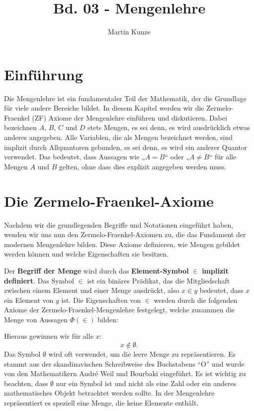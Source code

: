 \documentclass[main.tex]{subfiles}
\title{Bd. 03 - Mengenlehre}
\author{Martin Kunze}
\date{}
\begin{document}
\maketitle
\tableofcontents



\chapter{Einführung}

Die Mengenlehre ist ein fundamentaler Teil der Mathematik, der die Grundlage für viele andere Bereiche bildet. In diesem Kapitel werden wir die Zermelo-Fraenkel (ZF) Axiome der Mengenlehre einführen und diskutieren. Dabei bezeichnen \( A \), \( B \), \( C \) und \( D \) stets Mengen, es sei denn, es wird ausdrücklich etwas anderes angegeben. Alle Variablen, die als Mengen bezeichnet werden, sind implizit durch Allquantoren gebunden, es sei denn, es wird ein anderer Quantor verwendet. Das bedeutet, dass Aussagen wie „\( A = B \)“ oder „\( A \neq B \)“ für alle Mengen \( A \) und \( B \) gelten, ohne dass dies explizit angegeben werden muss.

\chapter{Die Zermelo-Fraenkel-Axiome}
Nachdem wir die grundlegenden Begriffe und Notationen eingeführt haben, wenden wir uns nun den Zermelo-Fraenkel-Axiomen zu, die das Fundament der modernen Mengenlehre bilden. Diese Axiome definieren, wie Mengen gebildet werden können und welche Eigenschaften sie besitzen.
\begin{definition}
Der \textbf{Begriff der Menge} wird durch das \textbf{Element-Symbol} \(\in\) \textbf{implizit definiert}. 
Das Symbol \(\in\) ist ein binäres Prädikat, das die Mitgliedschaft zwischen einem Element und einer Menge 
ausdrückt, also \(x \in y\) bedeutet, dass \(x\) ein Element von \(y\) ist. Die Eigenschaften von \(\in\) 
werden durch die folgenden Axiome der Zermelo-Fraenkel-Mengenlehre festgelegt, welche zusammen die Menge von 
Aussagen \(\Phi(\in)\) bilden:
\end{definition}



\begin{remark}
    Hieraus gewinnen wir für alle \(x\):
    \[
    x \not\in \emptyset.
    \]
Das Symbol \(\emptyset\) wird oft verwendet, um die leere Menge zu repräsentieren. Es stammt aus der skandinavischen Schreibweise des Buchstabens "`O"' und wurde von den Mathematikern André Weil und Bourbaki eingeführt. Es ist wichtig zu beachten, dass \(\emptyset\) nur ein Symbol ist und nicht als eine Zahl oder ein anderes mathematisches Objekt betrachtet werden sollte. In der Mengenlehre repräsentiert es speziell eine Menge, die keine Elemente enthält.
\end{remark}
\end{document}
